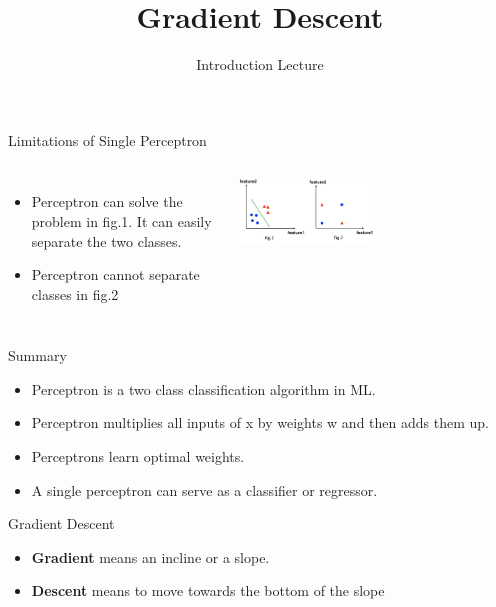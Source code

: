 \documentclass[aspectratio=169,14pt,usenames,dvipsnames]{beamer}
\begin{document}
\begin{frame}{Limitations of Single Perceptron}
\begin{columns}
\begin{itemize}
\item Perceptron can solve the problem in fig.1. It can easily separate the two classes. 
\item Perceptron cannot separate classes in fig.2
\end{itemize}
\includegraphics[width=0.5\textwidth, height=0.3\textheight]{Images/AIML_Percep_IMG14.png}
\end{columns}
\end{frame}

\begin{frame}{Summary}
\begin{itemize}
\item Perceptron is a two class classification algorithm in ML. 
\item Perceptron multiplies all inputs of x by weights w and then adds them up.
\item Perceptrons learn optimal weights. 
\item A single perceptron can serve as a classifier or regressor.
\end{itemize}
\centering
\end{frame}

{\1
\begin{frame} \vspace{35pt}
	\title[Gradient Descent ]{Gradient Descent }
	\subtitle [Introduction Lecture]{Introduction Lecture}
	
	\maketitle
\end{frame}
}

\begin{frame}{Gradient Descent}
\begin{itemize}
\item \textbf {Gradient} means an incline or a slope.
\item \textbf {Descent} means to move towards the bottom of the slope
\end{itemize}
\centering
\end{frame}
\end{document}
